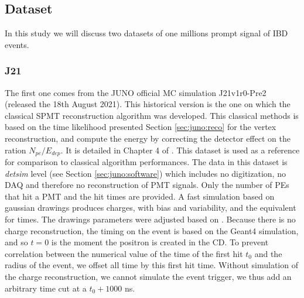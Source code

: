 \documentclass[../main.tex]{subfiles}
\begin{document}
{{\subsection{Dataset}


In this study we will discuss two datasets of one millions prompt signal of IBD events.

\subsubsection{J21}

The first one comes from the JUNO official MC simulation J21v1r0-Pre2 (released the 18th August 2021). This historical version is the one on which the classical SPMT reconstruction algorithm was developed. This classical methods is based on the time likelihood presented Section \ref{sec:juno:reco} for the vertex reconstruction, and compute the energy by correcting the detector effect on the ration $N_{pe}/E_{dep}$. It is detailed in Chapter 4 of \cite{lebrin_towards_2022}.
This dataset is used as a reference for comparison to classical algorithm performances.
The data in this dataset is \textit{detsim} level (see Section \ref{sec:juno:software})  which includes no digitization, no DAQ  and therefore no reconstruction of PMT signals. Only the number of PEs that hit a PMT and the hit times are provided. A fast simulation based on gaussian drawings produces charges, with bias and variability, and the equivalent for times. The drawings parameters were adjusted based on  \cite{cao_mass_2021, abusleme_mass_2022}.
Because there is no charge reconstruction, the timing on the event is based on the Geant4 simulation, and so $t=0$ is the moment the positron is created in the CD. To prevent correlation between the numerical value of the time of the first hit $t_0$ and the radius of the event, we offset all time by this first hit time. Without simulation of the charge reconstruction, we cannot simulate the event trigger, we thus add an arbitrary time cut at a $t_0 + 1000$ ns.

}}
\end{document}

